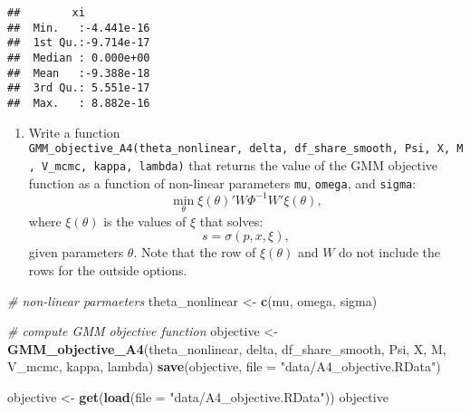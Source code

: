 \documentclass[
]{book}
\newenvironment{Shaded}{\begin{snugshade}}{\end{snugshade}}
\newcommand{\CommentTok}[1]{\textcolor[rgb]{0.56,0.35,0.01}{\textit{#1}}}
\newcommand{\DataTypeTok}[1]{\textcolor[rgb]{0.13,0.29,0.53}{#1}}
\newcommand{\KeywordTok}[1]{\textcolor[rgb]{0.13,0.29,0.53}{\textbf{#1}}}
\newcommand{\NormalTok}[1]{#1}
\newcommand{\StringTok}[1]{\textcolor[rgb]{0.31,0.60,0.02}{#1}}
\providecommand{\tightlist}{%
  \setlength{\itemsep}{0pt}\setlength{\parskip}{0pt}}
\begin{document}
\begin{verbatim}
##        xi            
##  Min.   :-4.441e-16  
##  1st Qu.:-9.714e-17  
##  Median : 0.000e+00  
##  Mean   :-9.388e-18  
##  3rd Qu.: 5.551e-17  
##  Max.   : 8.882e-16
\end{verbatim}

\begin{enumerate}
\def\labelenumi{\arabic{enumi}.}
\setcounter{enumi}{10}
\tightlist
\item
  Write a function \texttt{GMM\_objective\_A4(theta\_nonlinear,\ delta,\ df\_share\_smooth,\ Psi,\ X,\ M,\ V\_mcmc,\ kappa,\ lambda)} that returns the value of the GMM objective function as a function of non-linear parameters \texttt{mu}, \texttt{omega}, and \texttt{sigma}:
  \[
  \min_{\theta} \xi(\theta)' W \Phi^{-1} W' \xi(\theta),
  \]
  where \(\xi(\theta)\) is the values of \(\xi\) that solves:
  \[
  s = \sigma(p, x, \xi),
  \]
  given parameters \(\theta\). Note that the row of \(\xi(\theta)\) and \(W\) do not include the rows for the outside options.
\end{enumerate}

\begin{Shaded}
\begin{Highlighting}[]
\CommentTok{# non-linear parmaeters}
\NormalTok{theta_nonlinear <-}\StringTok{ }\KeywordTok{c}\NormalTok{(mu, omega, sigma)}
\end{Highlighting}
\end{Shaded}

\begin{Shaded}
\begin{Highlighting}[]
\CommentTok{# compute GMM objective function}
\NormalTok{objective <-}
\StringTok{  }\KeywordTok{GMM_objective_A4}\NormalTok{(theta_nonlinear, delta, df_share_smooth, Psi, }
\NormalTok{                   X, M, V_mcmc, kappa, lambda) }
\KeywordTok{save}\NormalTok{(objective, }\DataTypeTok{file =} \StringTok{"data/A4_objective.RData"}\NormalTok{)}
\end{Highlighting}
\end{Shaded}

\begin{Shaded}
\begin{Highlighting}[]
\NormalTok{objective <-}\StringTok{ }\KeywordTok{get}\NormalTok{(}\KeywordTok{load}\NormalTok{(}\DataTypeTok{file =} \StringTok{"data/A4_objective.RData"}\NormalTok{))}
\NormalTok{objective}
\end{Highlighting}
\end{Shaded}
\end{document}
